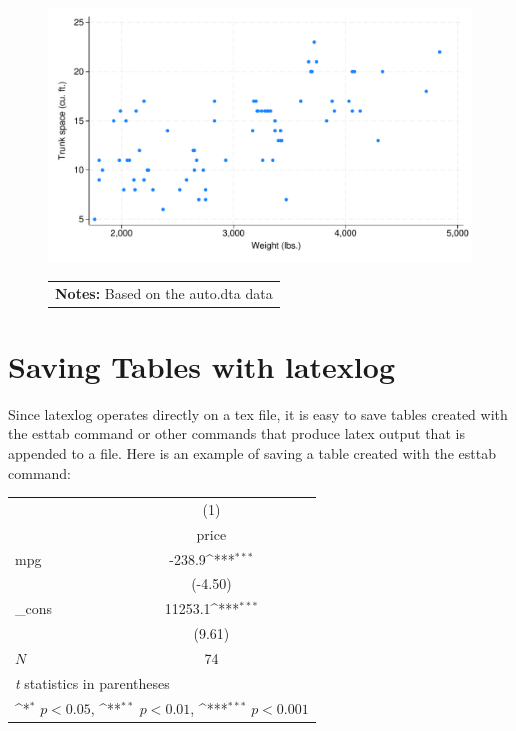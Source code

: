 \documentclass{article}
\begin{document}
\begin{figure}[h]
{\includegraphics[width = .3\textwidth]{scatter_trunk.pdf}  
}
\begin{tabular}{p{6in}}  
\footnotesize \vspace{2pt} 
\centering \textbf{Notes:} Based on the auto.dta data 
\end{tabular} 
\end{figure} 
\clearpage\pagebreak
\section{Saving Tables with latexlog}
Since latexlog operates directly on a tex file, it is easy to save 
tables created with the esttab command or other commands that 
produce latex output that is appended to a file.
Here is an example of saving a table created with the esttab command:
 
\vspace{10pt}
{
\def\sym#1{\ifmmode^{#1}\else\(^{#1}\)\fi}
\begin{tabular}{l*{1}{c}}
\toprule
            &\multicolumn{1}{c}{(1)}\\
            &\multicolumn{1}{c}{price}\\
\midrule
mpg         &      -238.9\sym{***}\\
            &     (-4.50)         \\
\addlinespace
\_cons      &     11253.1\sym{***}\\
            &      (9.61)         \\
\midrule
\(N\)       &          74         \\
\bottomrule
\multicolumn{2}{l}{\footnotesize \textit{t} statistics in parentheses}\\
\multicolumn{2}{l}{\footnotesize \sym{*} \(p<0.05\), \sym{**} \(p<0.01\), \sym{***} \(p<0.001\)}\\
\end{tabular}
}
\end{document}
